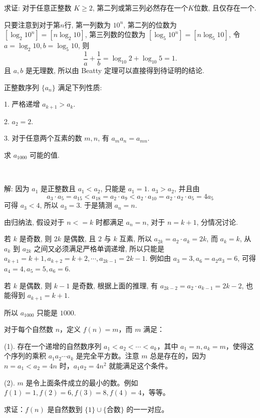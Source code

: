求证: 对于任意正整数 $K\ge 2$, 第二列或第三列必然存在一个$K$位数, 且仅存在一个. 

只要注意到对于第$n$行, 第一列数为 $10^n$, 第二列的位数为 $[\log_2{10^n}] = [n\log_2{10}]$, 第三列数的位数为 $[\log_5{10^n}] = [n\log_5{10}]$, 令$a = \log_2{10}, b=\log_5{10}$, 则 
\[\frac{1}{a}+\frac{1}{b} = \log_{10}2 + \log_{10}5 = 1.\]
且 $a,b$ 是无理数, 所以由 Beatty 定理可以直接得到待证明的结论.


\newpage

正整数序列 $\{a_n\}$ 满足下列性质: 

1. 严格递增 $a_{k+1} > a_k$.

2. $a_2 = 2$.

3. 对于任意两个互素的数 $m,n$, 有 $a_ma_n = a_{mn}$.

求 $a_{1000}$ 可能的值.

~

解: 因为 $a_1$ 是正整数且 $a_1 < a_2$, 只能是 $a_1 = 1$.
$a_3 > a_2$, 并且由 
\[ a_3\cdot a_5 = a_{15} < a_{18} = a_2\cdot a_9 < a_2\cdot a_{10} = a_2\cdot a_2\cdot a_5 = 4a_5\] 
可得 $a_3 < 4$, 所以 $a_3 = 3$. 于是猜测 $a_n = n$.

由归纳法, 假设对于 $n <= k$ 时都满足 $a_n = n$, 对于 $n = k + 1$, 分情况讨论.

若 $k$ 是奇数, 则 $2k$ 是偶数, 且 $2$ 与 $k$ 互素, 所以 $a_{2k} = a_2\cdot a_k = 2k$, 而 $a_k = k$, 从$a_k$ 到 $a_{2k}$ 之间又必须满足严格单调递增, 所以只能是 $a_{k+1}=k+1, a_{k+2}=k+2, \cdots, a_{2k-1} = 2k-1$. 例如由 $a_3 = 3, a_6 = a_2a_3 = 6$, 可得 $a_4 = 4, a_5 = 5, a_6 = 6$.

若 $k$ 是偶数, 则 $k-1$ 是奇数, 根据上面的推理, 有 $a_{2k-2} = a_2\cdot a_{k-1} = 2k-2$, 也能得到 $a_{k+1} = k+1$.

所以 $a_{1000}$ 只能是 $1000$.


\newpage
对于每个自然数 $ n $，定义 $ f(n)=m $，而 $ m $ 满足：

(1). 存在一个递增的自然数序列 $ a_1<a_2<\cdots <a_k $，其中 $ a_1 = n, a_k=m $，使得这个序列的乘积 $ a_1a_2\cdots a_k $ 是完全平方数。注意 $ m $ 总是存在的，因为 $ n = a_1 < a_2 = 4n $ 时，$ a_1a_2=4n^2 $ 就能满足这个条件。

(2). $ m $ 是令上面条件成立的最小的数。例如 $ f(1) = 1, f(2) = 6, f(3) = 8, f(4) = 4 $，等等。

求证：$ f(n) $ 是自然数到 $ \{1\} \cup \{\text{合数} \} $ 的一一对应。

